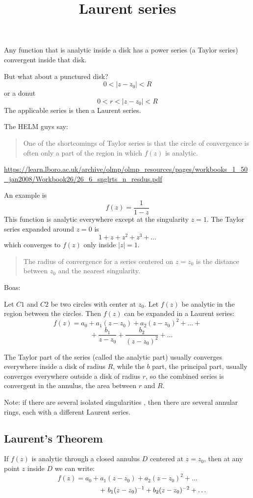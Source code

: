 \documentclass[11pt, oneside]{article}
\title{Laurent series}
\date{}
\begin{document}
 
\maketitle
\Large


Any function that is analytic inside a disk has a power series (a Taylor series) convergent inside that disk.

But what about a punctured disk?
\[ 0 < |z-z_0| < R \]
 or a donut 
\[ 0 < r < |z-z_0| < R \]
The applicable series is then a Laurent series.

The HELM guys say: 
\begin{quote}One of the shortcomings of Taylor series is that the circle of convergence is often only a part of the region in which $f(z)$ is analytic.\end{quote}

\url{https://learn.lboro.ac.uk/archive/olmp/olmp_resources/pages/workbooks_1_50_jan2008/Workbook26/26_6_snglrts_n_resdus.pdf}

An example is
\[ f(z) = \frac{1}{1 - z} \]
This function is analytic everywhere except at the singularity $z = 1$.  The Taylor series expanded around $z = 0$ is
\[ 1 + z + z^2 + z^3 + \dots \]
which converges to $f(z)$ only inside $|z|=1$.

\begin{quote}The radius of convergence for a series centered on $z = z_0$ is the distance between $z_0$ and the nearest singularity.\end{quote}

Boas:

Let $C1$ and $C2$ be two circles with center at $z_0$.  Let $f(z)$ be analytic in the region between the circles.  Then $f(z)$ can be expanded in a Laurent series:
\[ f(z) = a_0 + a_1 (z - z_0) + a_2 (z - z_0)^2 + \dots + \]
\[ \ \ \ \ \ + \frac{b_1}{z - z_0} + \frac{b_2}{(z - z_0)^2} + \dots \]

The Taylor part of the series (called the analytic part) usually converges everywhere inside a disk of radius $R$, while the $b$ part, the principal part, usually converges everywhere outside a disk of radius $r$, so the combined series is convergent in the annulus, the area between $r$ and $R$.

Note:  if there are several isolated singularities , then there are several annular rings, each with a different Laurent series.

\subsection*{Laurent's Theorem}
If $f(z)$ is analytic through a closed annulus $D$ centered at $z = z_0$, then at any point $z$ inside $D$ we can write:
\[ f(z) = a_0 + a_1(z-z_0) + a_2(z-z_0)^2 + \dots \]
\[ \hspace{27mm} + \ b_1(z-z_0)^{-1} + b_2(z-z_0)^{-2} + \dots \]
\end{document}
